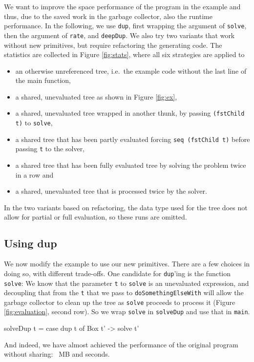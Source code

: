 \documentclass[preprint]{sigplanconf}
\theoremstyle{nonumberplain}
\newcommand{\li}{\lstinline[style=Haskell]}
\begin{document}
We want to improve the space performance of the program in the example and thus, due to the saved work in the garbage collector, also the runtime performance. In the following, we use \li-dup-, first wrapping the argument of \li-solve-, then the argument of \li-rate-, and \li-deepDup-. We also try two variants that work without new primitives, but require refactoring the generating code. The statistics are collected in Figure \ref{fig:stats}, where all six strategies are applied to
\begin{itemize}
\item an otherwise unreferenced tree, i.e.\ the example code without the last line of the main function,
\item a shared, unevaluated tree as shown in Figure \ref{fig:ex},
\item a shared, unevaluated tree wrapped in another thunk, by passing \li-(fstChild t)- to \li-solve-,
\item a shared tree that has been partly evaluated forcing \li-seq (fstChild t)- before passing \li-t- to the solver,
\item a shared tree that has been fully evaluated tree by solving the problem twice in a row and
\item a shared, unevaluated tree that is processed twice by the solver.
\end{itemize}
In the two variants based on refactoring, the data type used for the tree does not allow for partial or full evaluation, so these runs are omitted.

\subsection{Using dup}

We now modify the example to use our new primitives. There are a few choices in doing so, with different trade-offs. One candidate for \li-dup-’ing is the function \li-solve-: We know that the parameter \li-t- to \li-solve- is an unevaluated expression, and decoupling that from the \li-t- that we pass to \li-doSomethingElseWith- will allow the garbage collector to clean up the tree as \li-solve- proceeds to process it (Figure \ref{fig:evaluation}, second row). So we wrap \li-solve- in \li-solveDup- and use that in \li-main-.
\begin{haskell}
solveDup t = case dup t of Box t' -> solve t'
\end{haskell}
And indeed, we have almost achieved the performance of the original program without sharing: ~MB and  seconds.
\end{document}
